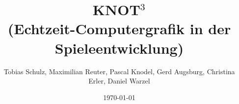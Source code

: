 \documentclass{scrreprt}
\begin{document}
\title{KNOT$^3$\\(Echtzeit-Computergrafik in der Spieleentwicklung)}
\author{Tobias Schulz, Maximilian Reuter, Pascal Knodel, Gerd Augsburg, Christina Erler, Daniel Warzel} 
\date{\today}%

\maketitle

\tableofcontents


















\end{document}
